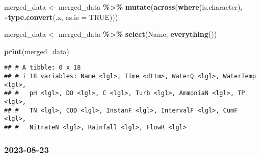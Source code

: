 \documentclass[
]{article}
\newenvironment{Shaded}{\begin{snugshade}}{\end{snugshade}}
\newcommand{\AttributeTok}[1]{\textcolor[rgb]{0.13,0.29,0.53}{#1}}
\newcommand{\ConstantTok}[1]{\textcolor[rgb]{0.56,0.35,0.01}{#1}}
\newcommand{\FunctionTok}[1]{\textcolor[rgb]{0.13,0.29,0.53}{\textbf{#1}}}
\newcommand{\NormalTok}[1]{#1}
\newcommand{\OtherTok}[1]{\textcolor[rgb]{0.56,0.35,0.01}{#1}}
\newcommand{\SpecialCharTok}[1]{\textcolor[rgb]{0.81,0.36,0.00}{\textbf{#1}}}
\begin{document}
\begin{Shaded}
\begin{Highlighting}[]
\NormalTok{merged\_data }\OtherTok{\textless{}{-}}\NormalTok{ merged\_data }\SpecialCharTok{\%\textgreater{}\%}
  \FunctionTok{mutate}\NormalTok{(}\FunctionTok{across}\NormalTok{(}\FunctionTok{where}\NormalTok{(is.character), }\SpecialCharTok{\textasciitilde{}}\FunctionTok{type.convert}\NormalTok{(.x, }\AttributeTok{as.is =} \ConstantTok{TRUE}\NormalTok{)))}


\NormalTok{merged\_data }\OtherTok{\textless{}{-}}\NormalTok{ merged\_data }\SpecialCharTok{\%\textgreater{}\%} \FunctionTok{select}\NormalTok{(Name, }\FunctionTok{everything}\NormalTok{())}


\FunctionTok{print}\NormalTok{(merged\_data)}
\end{Highlighting}
\end{Shaded}

\begin{verbatim}
## # A tibble: 0 x 18
## # i 18 variables: Name <lgl>, Time <dttm>, WaterQ <lgl>, WaterTemp <lgl>,
## #   pH <lgl>, DO <lgl>, C <lgl>, Turb <lgl>, AmmoniaN <lgl>, TP <lgl>,
## #   TN <lgl>, COD <lgl>, InstanF <lgl>, IntervalF <lgl>, CumF <lgl>,
## #   NitrateN <lgl>, Rainfall <lgl>, FlowR <lgl>
\end{verbatim}

\subsubsection{2023-08-23}\label{section-1}
\end{document}
